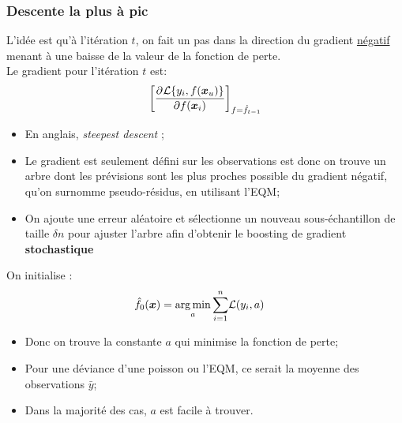 \documentclass[10pt, french]{article}
\begin{document}
\begin{multicols*}{3}
\subsubsection*{Descente la plus à pic}
L'idée est qu'à l'itération $t$, on fait un pas dans la direction du gradient \underline{négatif} menant à une baisse de la valeur de la fonction de perte.\\
Le gradient pour l'itération $t$ est:
\begin{align*}
	\left[
		\deriv{f(\bm{x}_{i})}{\mathcal{L}\{y_{i}, f(\bm{x}_{u})\}}
	\right]_{f = \hat{f}_{t - 1}}
\end{align*}
\begin{itemize}
	\item	En anglais, \og \textit{steepest descent} \fg{};
	\item	Le gradient est seulement défini sur les observations est donc on trouve un arbre dont les prévisions sont les plus proches possible du gradient négatif, qu'on surnomme pseudo-résidus, en utilisant l'EQM;
	\item	On ajoute une erreur aléatoire et sélectionne un nouveau sous-échantillon de taille $\delta n$ pour ajuster l'arbre afin d'obtenir le boosting de gradient \textbf{stochastique}
\end{itemize}

\begin{algo2}
On initialise :
\begin{align*}
	\hat{f}_{0}(\bm{x})	&=	\argmin_{a} \sumz{n}{i = 1} \mathcal{L}(y_{i}, a)
\end{align*}
\begin{itemize}[leftmargin = *]
	\item	Donc on trouve la constante $a$ qui minimise la fonction de perte;
	\item	Pour une déviance d'une poisson ou l'EQM, ce serait la moyenne des observations $\bar{y}$;
	\item	Dans la majorité des cas, $a$ est facile à trouver.
\end{itemize}


\end{algo2}
\end{multicols*}
\end{document}

